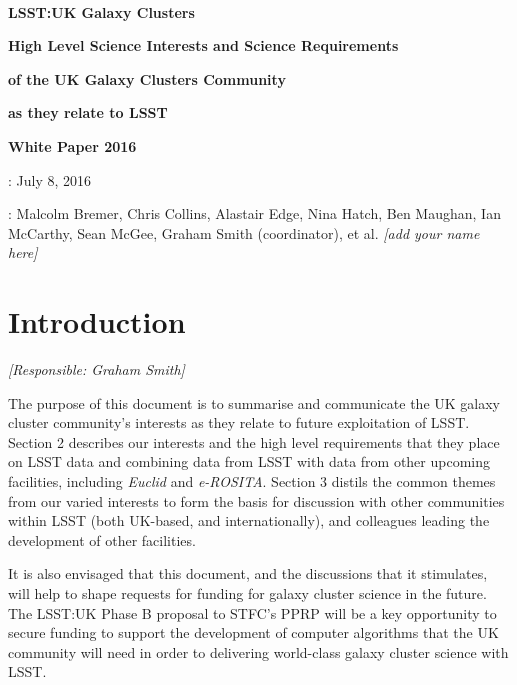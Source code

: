 \documentclass[a4paper,11pt]{article}
\begin{document}
\pagestyle{myheadings}

\sloppy

\pagestyle{empty}

~\vspace{70mm}

\centerline{\LARGE\bf LSST:UK Galaxy Clusters}
\bigskip\bigskip\bigskip
\centerline{\Large\bf High Level Science Interests and Science Requirements}
\medskip
\centerline{\Large\bf of the UK Galaxy Clusters Community}
\medskip
\centerline{\Large\bf as they relate to LSST}
\bigskip\bigskip\bigskip
\centerline{\Large\bf White Paper 2016}

\vspace{90mm}

\large
{}: July 8, 2016

: Malcolm Bremer, Chris Collins, Alastair
Edge, Nina Hatch, Ben Maughan, Ian McCarthy, Sean McGee, Graham Smith (coordinator), et al. {\it
  [add your name here]}


\newpage
\pagestyle{myheadings}
\setlength{\topmargin}{-10mm}
\setlength{\textheight}{255mm}

\tableofcontents

\newpage

\section{Introduction}\label{sec:intro}

{\it [Responsible: Graham Smith]}

\noindent
The purpose of this document is to summarise and communicate the UK
galaxy cluster community's interests as they relate to future
exploitation of LSST.  Section 2 describes our interests and the high
level requirements that they place on LSST data and combining data
from LSST with data from other upcoming facilities, including
\emph{Euclid} and \emph{e-ROSITA}.  Section 3 distils the common
themes from our varied interests to form the basis for discussion with
other communities within LSST (both UK-based, and internationally),
and colleagues leading the development of other facilities.

It is also envisaged that this document, and the discussions that it
stimulates, will help to shape requests for funding for galaxy cluster
science in the future.  The LSST:UK Phase B proposal to STFC's PPRP
will be a key opportunity to secure funding to support the development
of computer algorithms that the UK community will need in order to
delivering world-class galaxy cluster science with LSST.
\end{document}

